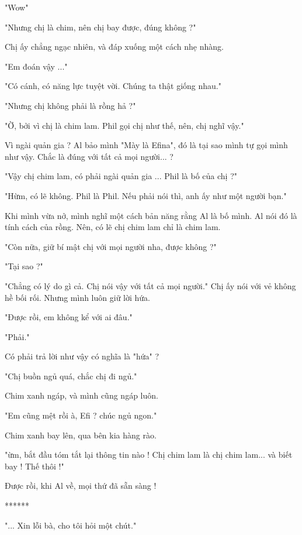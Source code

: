 "Wow"
 
 "Nhưng chị là chim, nên chị bay được, đúng không ?"
 
 Chị ấy chẳng ngạc nhiên, và đáp xuống một cách nhẹ nhàng.
 
 "Em đoán vậy ..."
 
 "Có cánh, có năng lực tuyệt vời. Chúng ta thật giống nhau."
 
 "Nhưng chị không phải là rồng hả ?"
 
 "Ờ, bởi vì chị là chim lam. Phil gọi chị như thế, nên, chị nghĩ vậy."
 
 Vì ngài quản gia ? Al bảo mình "Mày là Efina", đó là tại sao mình tự gọi mình như vậy. Chắc là đúng với tất cả mọi người... ?
 
 "Vậy chị chim lam, có phải ngài quản gia ... Phil là bố của chị ?"
 
 "Hừm, có lẽ không. Phil là Phil. Nếu phải nói thì, anh ấy như một người bạn."
 
 Khi mình vừa nở, mình nghĩ một cách bản năng rằng Al là bố mình. Al nói đó là tính cách của rồng. Nên, có lẽ chị chim lam chỉ là chim lam.
 
 "Còn nữa, giữ bí mật chị với mọi người nha, được không ?"
 
 "Tại sao ?"
 
 "Chẳng có lý do gì cả. Chị nói vậy với tất cả mọi người." Chị ấy nói với vẻ không hề bối rối. Nhưng mình luôn giữ lời hứa.
 
 "Được rồi, em không kể với ai đâu."
 
 "Phải."
 
 Có phải trả lời như vậy có nghĩa là "hứa" ?
 
 "Chị buồn ngủ quá, chắc chị đi ngủ."
 
 Chim xanh ngáp, và mình cũng ngáp luôn.
 
 "Em cũng mệt rồi à, Efi ? chúc ngủ ngon."
 
 Chim xanh bay lên, qua bên kia hàng rào.
 
 "ừm, bắt đầu tóm tắt lại thông tin nào ! Chị chim lam là chị chim lam... và biết bay ! Thế thôi !"
 
 Được rồi, khi Al về, mọi thứ đã sẵn sàng !
 
\begin{center}
	 ******
\end{center}
 
 
 "... Xin lỗi bà, cho tôi hỏi một chút."
 
